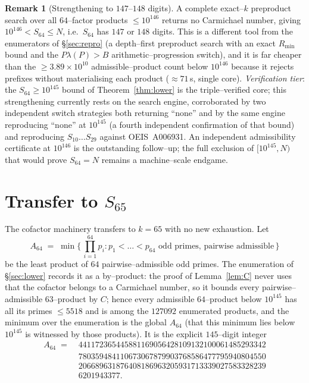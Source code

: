 \documentclass[11pt]{article}
\theoremstyle{definition}
\newtheorem{remark}{Remark}
\newcommand{\Smin}{S_{64}}
\begin{document}
\begin{remark}[Strengthening to $147$--$148$ digits]
A complete exact--$k$ preproduct search over all $64$--factor products $\le 10^{146}$ returns no
Carmichael number, giving $10^{146}<\Smin\le N$, i.e.\ $\Smin$ has $147$ or $148$ digits. This is a
different tool from the enumerators of \S\ref{sec:repro} (a depth--first preproduct search with an
exact $R_{\min}$ bound and the $P\lambda(P)>B$ arithmetic--progression switch), and it is far cheaper
than the $\ge 3.89\times10^{10}$ admissible--product count below $10^{146}$ because it rejects
prefixes without materialising each product ($\approx 71$\,s, single core). \emph{Verification
tier}: the $\Smin\ge 10^{145}$ bound of Theorem~\ref{thm:lower} is the triple--verified core; this
strengthening currently rests on the search engine, corroborated by two independent switch strategies
both returning ``none'' and by the same engine reproducing ``none'' at $10^{145}$ (a fourth
independent confirmation of that bound) and reproducing $S_{10}\dots S_{29}$ against
OEIS~A006931. An independent admissibility certificate at $10^{146}$ is the outstanding follow--up;
the full exclusion of $[10^{145},N)$ that would prove $\Smin=N$ remains a machine--scale endgame.
\end{remark}

\section{Transfer to $S_{65}$}\label{sec:s65}

The cofactor machinery transfers to $k=65$ with no new exhaustion. Let
\[
  A_{64}\;=\;\min\{\,\textstyle\prod_{i=1}^{64}p_i : p_1<\dots<p_{64}\text{ odd primes, pairwise admissible}\,\}
\]
be the least product of $64$ pairwise--admissible odd primes. The enumeration of \S\ref{sec:lower}
records it as a by--product: the proof of Lemma~\ref{lem:C} never uses that the cofactor belongs to a
Carmichael number, so it bounds every pairwise--admissible $63$--product by $C$; hence every admissible
$64$--product below $10^{145}$ has all its primes $\le5518$ and is among the $127092$ enumerated
products, and the minimum over the enumeration is the global $A_{64}$ (that this minimum lies below
$10^{145}$ is witnessed by those products). It is the explicit $145$--digit integer
\[
  \begin{aligned}
  A_{64} \;=\;{}& 441172365445881169056428109132100061485293342\\
  &780359484110673067879903768586477795940804550\\
  &206689631876408186963205931713339027583328239\\
  &6201943377 .
\end{aligned}
\]
\end{document}
